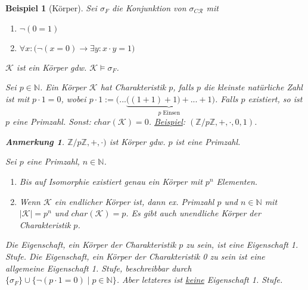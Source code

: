 \documentclass{article}
\theoremstyle{definition}
\theoremstyle{plain}
\newtheorem*{anm}{Anmerkung}
\newtheorem*{bsp}{Beispiel}
\newcommand{\m}[1]{\mathcal{#1}}
\begin{document}
    \begin{bsp}[Körper]
        Sei $ \sigma_F $ die Konjunktion von $ \sigma_{C\m{R}} $ mit
        \begin{enumerate}
            \item $ \neg(0 = 1) $
            \item $ \forall x: \big( \neg( x = 0 ) \rightarrow \exists y: x \cdot y = 1 \big) $
        \end{enumerate}
        $ \m{K} $ ist ein Körper gdw. $ \m{K} \models \sigma_F $.

        Sei $ p \in \mathbb{N} $.
        Ein Körper $ \m{K} $ hat Charakteristik $ p $, falls $ p $ die kleinste natürliche Zahl ist mit $ p \cdot 1 = 0 $, wobei $ p \cdot 1 := \Big( ... \underbrace{\big((1 + 1) + 1 \big) + ... + 1}_{p \text{ Einsen}} \Big) $.
        Falls $ p $ existiert, so ist $ p $ eine Primzahl.
        Sonst: $ char(\m{K}) = 0 $.
        \underline{Beispiel}: $ (\mathbb{Z}/p\mathbb{Z}, +, \cdot, 0, 1) $.

        \begin{anm}
            $ \mathbb{Z}/p\mathbb{Z}, +, \cdot ) $ ist Körper gdw. $ p $ ist eine Primzahl.
        \end{anm}

        Sei $ p $ eine Primzahl, $ n \in \mathbb{N} $.
        \begin{enumerate}%
            \item Bis auf Isomorphie existiert genau ein Körper mit $ p^n $ Elementen.
            \item Wenn $ \m{K} $ ein endlicher Körper ist, dann ex. Primzahl $ p $ und $ n \in \mathbb{N} $ mit $ | \m{K} | = p^n $ und $ char(\m{K}) = p $.
            Es gibt auch unendliche Körper der Charakteristik $ p $.
        \end{enumerate}
        Die Eigenschaft, ein Körper der Charakteristik $ p $ zu sein, ist eine Eigenschaft 1. Stufe.
        Die Eigenschaft, ein Körper der Charakteristik  0 zu sein ist eine allgemeine Eigenschaft 1. Stufe, beschreibbar durch $ \{ \sigma_F \} \cup \big\{ \neg (p \cdot 1 = 0) \mid p \in \mathbb{N} \big\} $.
        Aber letzteres ist \underline{keine} Eigenschaft 1. Stufe.
    \end{bsp}
\end{document}
